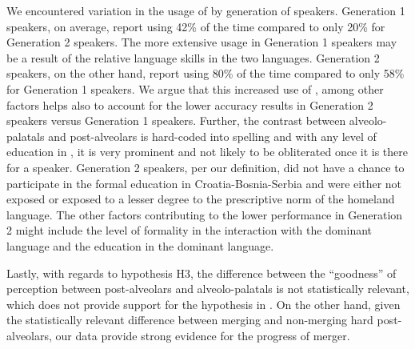 \documentclass[output=paper,modfonts,newtxmath,hidelinks,]{langscibook}
\begin{document}
We encountered variation in the usage of  by generation of speakers. Generation 1 speakers, on average, report using  42\% of the time compared to only 20\% for Generation 2 speakers. The more extensive usage in Generation 1 speakers may be a result of the relative language skills in the two languages. Generation 2 speakers, on the other hand, report using  80\% of the time compared to only 58\% for Generation 1 speakers. We argue that this increased use of , among other factors helps also to account for the lower accuracy results in Generation 2 speakers versus Generation 1 speakers. Further, the contrast between alveolo-palatals and post-alveolars is hard-coded into  spelling and with any level of education in , it is very prominent and not likely to be obliterated once it is there for a speaker. Generation 2 speakers, per our definition, did not have a chance to participate in the formal education in Croatia-Bosnia-Serbia and were either not exposed or exposed to a lesser degree to the prescriptive norm of the homeland language. The other factors contributing to the lower performance in Generation 2 might include the level of formality in the interaction with the dominant language and the education in the dominant language.



Lastly, with regards to hypothesis H3, the difference between the “goodness” of perception between post-alveolars and alveolo-palatals is not statistically relevant, which does not provide support for the hypothesis in \citet{Cavar-etal2016}. On the other hand, given the statistically relevant difference between merging and non-merging hard post-alveolars, our data provide strong evidence for the progress of merger.\largerpage[-1]
\end{document}
